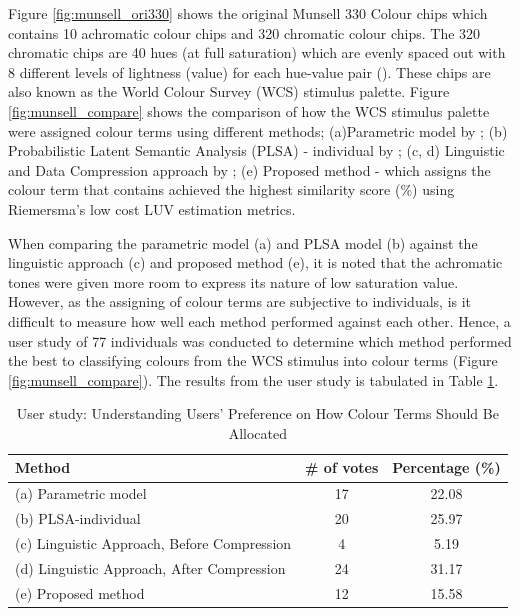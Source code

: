 Figure \ref{fig:munsell_ori330} shows the original Munsell 330 Colour chips which contains 10 achromatic colour chips and 320 chromatic colour chips. 
The 320 chromatic chips are 40 hues (at full saturation) which are evenly spaced out with 8 different levels of lightness (value) for each hue-value pair (\cite{kay2009world}).
These chips are also known as the World Colour Survey (WCS) stimulus palette.  
Figure \ref{fig:munsell_compare} shows the comparison of how the WCS stimulus palette were assigned colour terms using different methods; (a)Parametric model by ; (b) Probabilistic Latent Semantic Analysis (PLSA) - individual by ; (c, d) Linguistic and Data Compression approach by ; (e) Proposed method - which assigns the colour term that contains achieved the highest similarity score (\%) using Riemersma's low cost LUV estimation metrics.

When comparing the parametric model (a) and PLSA model (b) against the linguistic approach (c) and proposed method (e), it is noted that the achromatic tones were given more room to express its nature of low saturation value. However, as the assigning of colour terms are subjective to individuals, is it difficult to measure how well each method performed against each other. Hence, a user study of 77 individuals was conducted to determine which method performed the best to classifying colours from the WCS stimulus into colour terms (Figure \ref{fig:munsell_compare}). The results from the user study is tabulated in Table \ref{tab:munsell_result}. 

\begin{table}[H]\centering
\begin{tabular}{|l|c|c|}
\hline
\textbf{Method}                             & \textbf{\# of votes} & \textbf{Percentage (\%)} \\ \hline
(a) Parametric model                        & 17                   & 22.08              \\ \hline
(b) PLSA-individual                         & 20                   & 25.97              \\ \hline
(c) Linguistic Approach, Before Compression & 4                    & 5.19              \\ \hline
(d) Linguistic Approach, After Compression  & 24                   & 31.17              \\ \hline
(e) Proposed method                         & 12                   & 15.58              \\ \hline
\end{tabular}
\caption{User study: Understanding Users' Preference on How Colour Terms Should Be Allocated}
\label{tab:munsell_result}
\end{table}

